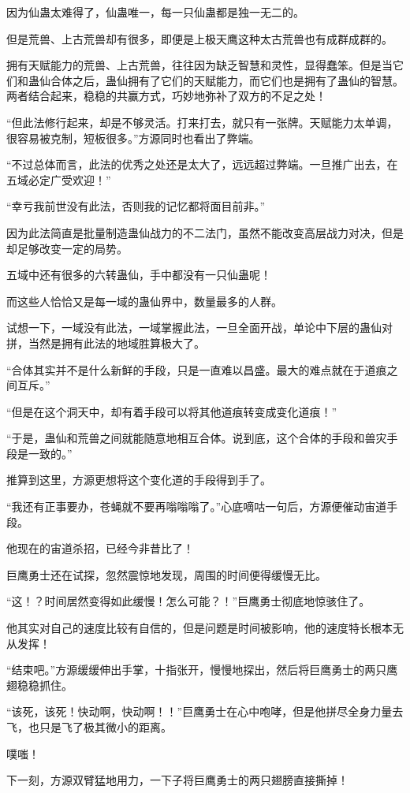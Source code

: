 \begin{this_body}
因为仙蛊太难得了，仙蛊唯一，每一只仙蛊都是独一无二的。

但是荒兽、上古荒兽却有很多，即便是上极天鹰这种太古荒兽也有成群成群的。

拥有天赋能力的荒兽、上古荒兽，往往因为缺乏智慧和灵性，显得蠢笨。但是当它们和蛊仙合体之后，蛊仙拥有了它们的天赋能力，而它们也是拥有了蛊仙的智慧。两者结合起来，稳稳的共赢方式，巧妙地弥补了双方的不足之处！

“但此法修行起来，却是不够灵活。打来打去，就只有一张牌。天赋能力太单调，很容易被克制，短板很多。”方源同时也看出了弊端。

“不过总体而言，此法的优秀之处还是太大了，远远超过弊端。一旦推广出去，在五域必定广受欢迎！”

“幸亏我前世没有此法，否则我的记忆都将面目前非。”

因为此法简直是批量制造蛊仙战力的不二法门，虽然不能改变高层战力对决，但是却足够改变一定的局势。

五域中还有很多的六转蛊仙，手中都没有一只仙蛊呢！

而这些人恰恰又是每一域的蛊仙界中，数量最多的人群。

试想一下，一域没有此法，一域掌握此法，一旦全面开战，单论中下层的蛊仙对拼，当然是拥有此法的地域胜算极大了。

“合体其实并不是什么新鲜的手段，只是一直难以昌盛。最大的难点就在于道痕之间互斥。”

“但是在这个洞天中，却有着手段可以将其他道痕转变成变化道痕！”

“于是，蛊仙和荒兽之间就能随意地相互合体。说到底，这个合体的手段和兽灾手段是一致的。”

推算到这里，方源更想将这个变化道的手段得到手了。

“我还有正事要办，苍蝇就不要再嗡嗡嗡了。”心底嘀咕一句后，方源便催动宙道手段。

他现在的宙道杀招，已经今非昔比了！

巨鹰勇士还在试探，忽然震惊地发现，周围的时间便得缓慢无比。

“这！？时间居然变得如此缓慢！怎么可能？！”巨鹰勇士彻底地惊骇住了。

他其实对自己的速度比较有自信的，但是问题是时间被影响，他的速度特长根本无从发挥！

“结束吧。”方源缓缓伸出手掌，十指张开，慢慢地探出，然后将巨鹰勇士的两只鹰翅稳稳抓住。

“该死，该死！快动啊，快动啊！！”巨鹰勇士在心中咆哮，但是他拼尽全身力量去飞，也只是飞了极其微小的距离。

噗嗤！

下一刻，方源双臂猛地用力，一下子将巨鹰勇士的两只翅膀直接撕掉！


\end{this_body}
